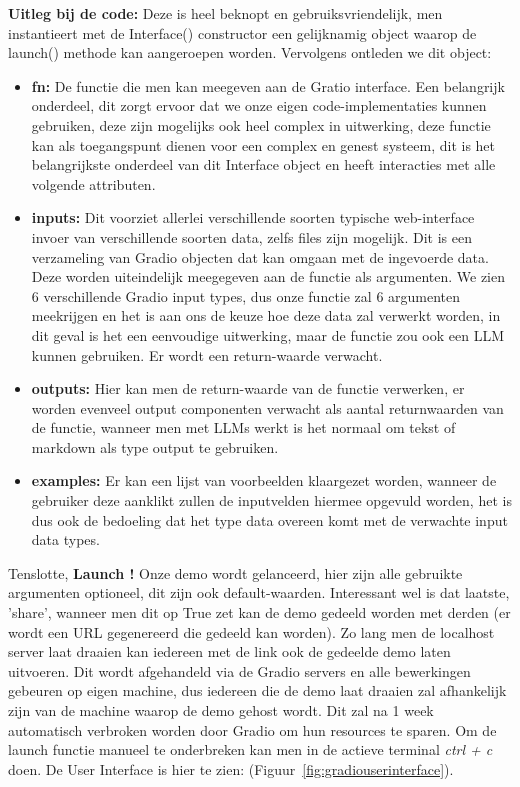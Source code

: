 \textbf{Uitleg bij de code:} Deze is heel beknopt en gebruiksvriendelijk, men instantieert met de Interface() constructor een gelijknamig object waarop de launch() methode kan aangeroepen worden. Vervolgens ontleden we dit object:
\begin{itemize}
    \item \textbf{fn:} De functie die men kan meegeven aan de Gratio interface. Een belangrijk onderdeel, dit zorgt ervoor dat we onze eigen code-implementaties kunnen gebruiken, deze zijn mogelijks ook heel complex in uitwerking, deze functie kan als toegangspunt dienen voor een complex en genest systeem, dit is het belangrijkste onderdeel van dit Interface object en heeft interacties met alle volgende attributen.
    \item \textbf{inputs:} Dit voorziet allerlei verschillende soorten typische web-interface invoer van verschillende soorten data, zelfs files zijn mogelijk. Dit is een verzameling van Gradio objecten dat kan omgaan met de ingevoerde data. Deze worden uiteindelijk meegegeven aan de functie als argumenten. We zien 6 verschillende Gradio input types, dus onze functie zal 6 argumenten meekrijgen en het is aan ons de keuze hoe deze data zal verwerkt worden, in dit geval is het een eenvoudige uitwerking, maar de functie zou ook een LLM kunnen gebruiken. Er wordt een return-waarde verwacht.
    \item \textbf{outputs:} Hier kan men de return-waarde van de functie verwerken, er worden evenveel output componenten verwacht als aantal returnwaarden van de functie, wanneer men met LLMs werkt is het normaal om tekst of markdown als type output te gebruiken.
    \item \textbf{examples:} Er kan een lijst van voorbeelden klaargezet worden, wanneer de gebruiker deze aanklikt zullen de inputvelden hiermee opgevuld worden, het is dus ook de bedoeling dat het type data overeen komt met de verwachte input data types.
\end{itemize}

Tenslotte, \textbf{Launch !} Onze demo wordt gelanceerd, hier zijn alle gebruikte argumenten optioneel, dit zijn ook default-waarden. Interessant wel is dat laatste, 'share', wanneer men dit op True zet kan de demo gedeeld worden met derden (er wordt een URL gegenereerd die gedeeld kan worden). Zo lang men de localhost server laat draaien kan iedereen met de link ook de gedeelde demo laten uitvoeren. Dit wordt afgehandeld via de Gradio servers en alle bewerkingen gebeuren op eigen machine, dus iedereen die de demo laat draaien zal afhankelijk zijn van de machine waarop de demo gehost wordt. Dit zal na 1 week automatisch verbroken worden door Gradio om hun resources te sparen. Om de launch functie manueel te onderbreken kan men in de actieve terminal \textit{ctrl + c} doen. De User Interface is hier te zien: (Figuur~\ref{fig:gradiouserinterface}).

